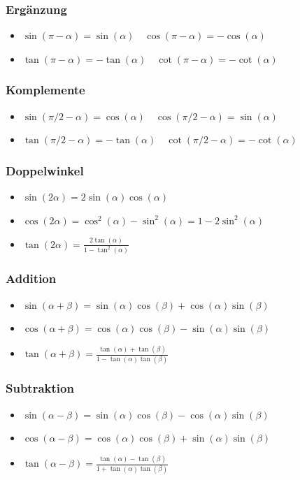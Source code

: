 \documentclass[8pt]{article}
\begin{document}
\begin{multicols*}{3}
\subsubsection{Ergänzung}
\begin{itemize}
 \item $\sin(\pi - \alpha) = \sin(\alpha) \quad \cos(\pi - \alpha) = - \cos(\alpha)$
 \item $\tan(\pi - \alpha) = -\tan(\alpha) \quad \cot(\pi - \alpha) = - \cot(\alpha)$
\end{itemize}


\subsubsection{Komplemente}
\begin{itemize}
 \item $\sin(\pi/2 - \alpha) = \cos(\alpha) \quad \cos(\pi/2 - \alpha) = \sin(\alpha)$
 \item $\tan(\pi/2 - \alpha) = -\tan(\alpha) \quad \cot(\pi/2 - \alpha) = -\cot(\alpha)$
\end{itemize}

\subsubsection{Doppelwinkel}
\begin{itemize}
 \item $\sin(2\alpha) = 2 \sin(\alpha) \cos(\alpha)$
 \item $\cos(2\alpha) = \cos^2(\alpha) - \sin^2(\alpha) = 1 - 2 \sin^2(\alpha)$
 \item $\tan(2\alpha) = \frac{2\tan(\alpha)}{1 - \tan^2(\alpha)}$
\end{itemize}

\subsubsection{Addition}
\begin{itemize}
 \item $\sin(\alpha + \beta) = \sin(\alpha) \cos(\beta) + \cos(\alpha) \sin(\beta)$
 \item $\cos(\alpha + \beta) = \cos(\alpha) \cos(\beta) - \sin(\alpha) \sin(\beta)$
 \item $\tan(\alpha + \beta) = \frac{\tan(\alpha) + \tan(\beta)}{1 - \tan(\alpha) \tan(\beta)}$
\end{itemize}

\subsubsection{Subtraktion}
\begin{itemize}
 \item $\sin(\alpha - \beta) = \sin(\alpha) \cos(\beta) - \cos(\alpha)\sin(\beta)$
 \item $\cos(\alpha - \beta) = \cos(\alpha) \cos(\beta) + \sin(\alpha)\sin(\beta)$
 \item $\tan(\alpha - \beta) = \frac{\tan(\alpha) - \tan(\beta)}{1+\tan(\alpha) \tan(\beta)}$
\end{itemize}


\end{multicols*}
\end{document}
